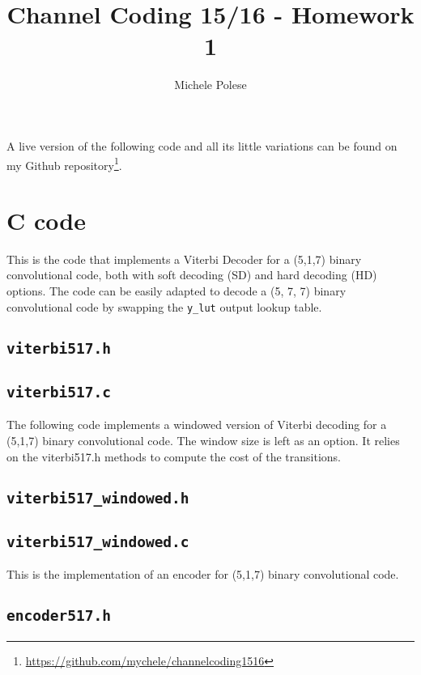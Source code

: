 \documentclass[10pt]{article}
\numberwithin{equation}{section}
\begin{document}
\title{Channel Coding 15/16 - Homework 1}
\author{Michele Polese}

\maketitle

A live version of the following code and all its little variations can be found on my Github repository\footnote{\url{https://github.com/mychele/channelcoding1516}}.

\section*{C code}

This is the code that implements a Viterbi Decoder for a (5,1,7) binary convolutional code, both with soft decoding (SD) and hard decoding (HD) options. The code can be easily adapted to decode a (5, 7, 7) binary convolutional code by swapping the \texttt{y\_lut} output lookup table.
\subsection*{\texttt{viterbi517.h}}

\subsection*{\texttt{viterbi517.c}}


The following code implements a windowed version of Viterbi decoding for a (5,1,7) binary convolutional code. The window size is left as an option. It relies on the viterbi517.h methods to compute the cost of the transitions.

\subsection*{\texttt{viterbi517\_windowed.h}}

\clearpage
\subsection*{\texttt{viterbi517\_windowed.c}}


This is the implementation of an encoder for (5,1,7) binary convolutional code.

\subsection*{\texttt{encoder517.h}}

\end{document}
